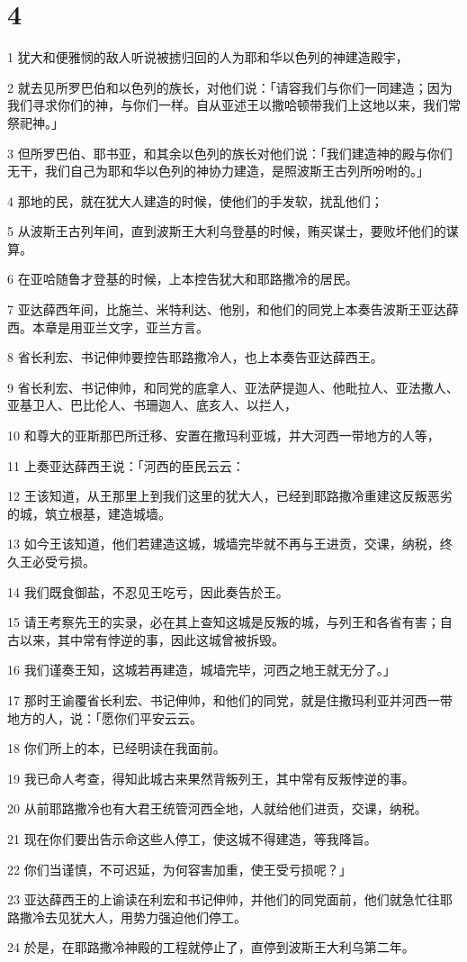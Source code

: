 \chapter{4}

\par 1 犹大和便雅悯的敌人听说被掳归回的人为耶和华以色列的神建造殿宇，
\par 2 就去见所罗巴伯和以色列的族长，对他们说：「请容我们与你们一同建造；因为我们寻求你们的神，与你们一样。自从亚述王以撒哈顿带我们上这地以来，我们常祭祀神。」
\par 3 但所罗巴伯、耶书亚，和其余以色列的族长对他们说：「我们建造神的殿与你们无干，我们自己为耶和华以色列的神协力建造，是照波斯王古列所吩咐的。」
\par 4 那地的民，就在犹大人建造的时候，使他们的手发软，扰乱他们；
\par 5 从波斯王古列年间，直到波斯王大利乌登基的时候，贿买谋士，要败坏他们的谋算。
\par 6 在亚哈随鲁才登基的时候，上本控告犹大和耶路撒冷的居民。
\par 7 亚达薛西年间，比施兰、米特利达、他别，和他们的同党上本奏告波斯王亚达薛西。本章是用亚兰文字，亚兰方言。
\par 8 省长利宏、书记伸帅要控告耶路撒冷人，也上本奏告亚达薛西王。
\par 9 省长利宏、书记伸帅，和同党的底拿人、亚法萨提迦人、他毗拉人、亚法撒人、亚基卫人、巴比伦人、书珊迦人、底亥人、以拦人，
\par 10 和尊大的亚斯那巴所迁移、安置在撒玛利亚城，并大河西一带地方的人等，
\par 11 上奏亚达薛西王说：「河西的臣民云云：
\par 12 王该知道，从王那里上到我们这里的犹大人，已经到耶路撒冷重建这反叛恶劣的城，筑立根基，建造城墙。
\par 13 如今王该知道，他们若建造这城，城墙完毕就不再与王进贡，交课，纳税，终久王必受亏损。
\par 14 我们既食御盐，不忍见王吃亏，因此奏告於王。
\par 15 请王考察先王的实录，必在其上查知这城是反叛的城，与列王和各省有害；自古以来，其中常有悖逆的事，因此这城曾被拆毁。
\par 16 我们谨奏王知，这城若再建造，城墙完毕，河西之地王就无分了。」
\par 17 那时王谕覆省长利宏、书记伸帅，和他们的同党，就是住撒玛利亚并河西一带地方的人，说：「愿你们平安云云。
\par 18 你们所上的本，已经明读在我面前。
\par 19 我已命人考查，得知此城古来果然背叛列王，其中常有反叛悖逆的事。
\par 20 从前耶路撒冷也有大君王统管河西全地，人就给他们进贡，交课，纳税。
\par 21 现在你们要出告示命这些人停工，使这城不得建造，等我降旨。
\par 22 你们当谨慎，不可迟延，为何容害加重，使王受亏损呢？」
\par 23 亚达薛西王的上谕读在利宏和书记伸帅，并他们的同党面前，他们就急忙往耶路撒冷去见犹大人，用势力强迫他们停工。
\par 24 於是，在耶路撒冷神殿的工程就停止了，直停到波斯王大利乌第二年。

